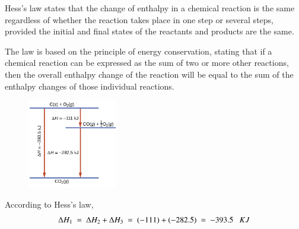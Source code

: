 \documentclass[12pt]{article}
\begin{document}
\vspace{3ex}
Hess's law states that the change of enthalpy in a chemical reaction is the same regardless of whether the reaction takes place in one step or several steps, provided the initial and final states of the reactants and products are the same.

The law is based on the principle of energy conservation, stating that if a chemical reaction can be expressed as the sum of two or more other reactions, then the overall enthalpy change of the reaction will be equal to the sum of the enthalpy changes of those individual reactions. 

\vspace{3ex}

\begin{figure}
\vspace{-5.5\baselineskip}\centering
\includegraphics[width=0.35\textwidth]{Figures/Hess Law.jpg}
\end{figure}

\vspace{1ex}
According to Hess's law,
\vspace{-\baselineskip}
$$\Delta H_1 \ = \ \Delta H_2 + \Delta H_3 \ = \ (-111) + (-282.5) \ = \ -393.5  \ \ \  KJ$$

\end{document}
